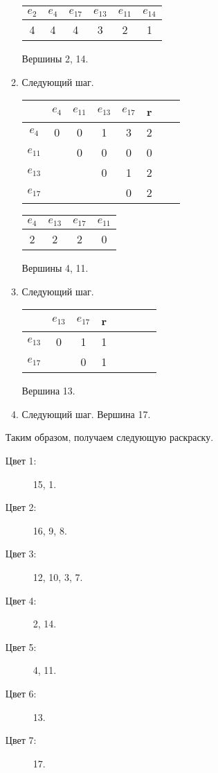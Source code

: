 \documentclass[12pt, a4paper] {ncc}
\begin{document}
\begin{enumerate}
\begin{enumerate}
\begin{center}
\begin{longtable}{|c c c c c c|}
\hline
$e_{2}$ & $e_{4}$ & $e_{17}$ & $e_{13}$ & $e_{11}$ & $e_{14}$ \\
\hline
4 & 4 & 4 & 3 & 2 & 1 \\
\hline
\end{longtable}
\end{center}

Вершины 2, 14.

        \item Следующий шаг.

\begin{tabular}{|c|c|c|c|c|c|c|c|}
\hline
      & $e_{4}$ & $e_{11}$ & $e_{13}$ & $e_{17}$ & r \\
\hline
$e_{4}$  & 0 & 0 & 1 & 3 & 2\\ \hline
$e_{11}$ &   & 0 & 0 & 0 & 0\\ \hline
$e_{13}$ &   &   & 0 & 1 & 2\\ \hline
$e_{17}$ &   &   &   & 0 & 2\\ \hline
\end{tabular}

\begin{center}
\begin{longtable}{|c c c c|}
\hline
$e_{4}$ & $e_{13}$ & $e_{17}$ & $e_{11}$ \\
\hline
2 & 2 & 2 & 0\\
\hline
\end{longtable}
\end{center}

Вершины 4, 11.

        \item Следующий шаг.

\begin{tabular}{|c|c|c|c|c|c|c|c|}
\hline
      & $e_{13}$ & $e_{17}$ & r \\
\hline
$e_{13}$ & 0 & 1 & 1\\ \hline
$e_{17}$ &   & 0 & 1\\ \hline
\end{tabular}

Вершина 13.
    \item Следующий шаг.
Вершина 17.
\end{enumerate}

Таким образом, получаем следующую раскраску.
\begin{description}
    \item[Цвет 1:] 15, 1.
    \item[Цвет 2:] 16, 9, 8.
    \item[Цвет 3:] 12, 10, 3, 7.
    \item[Цвет 4:] 2, 14.
    \item[Цвет 5:] 4, 11.
    \item[Цвет 6:] 13.
    \item[Цвет 7:] 17.
\end{description}

\end{enumerate}
\end{document}

